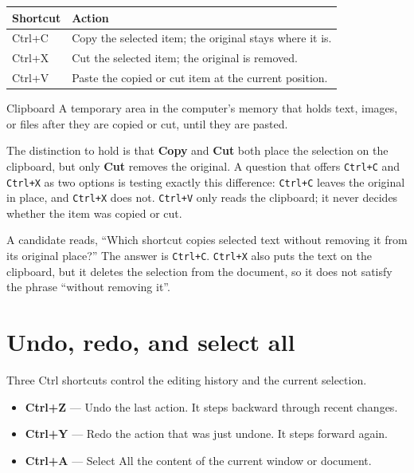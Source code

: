 \begin{center}
\begin{tabular}{p{}p{}}
\toprule
\textbf{Shortcut} & \textbf{Action} \\
\midrule
Ctrl+C & Copy the selected item; the original stays where it is. \\
Ctrl+X & Cut the selected item; the original is removed. \\
Ctrl+V & Paste the copied or cut item at the current position. \\
\bottomrule
\end{tabular}
\end{center}

\begin{definitionbox}{Clipboard}
A temporary area in the computer's memory that holds text, images, or files
after they are copied or cut, until they are pasted.
\end{definitionbox}

The distinction to hold is that \textbf{Copy} and \textbf{Cut} both place the
selection on the clipboard, but only \textbf{Cut} removes the original. A
question that offers \texttt{Ctrl+C} and \texttt{Ctrl+X} as two options is
testing exactly this difference: \texttt{Ctrl+C} leaves the original in place,
and \texttt{Ctrl+X} does not. \texttt{Ctrl+V} only reads the clipboard; it
never decides whether the item was copied or cut.

\begin{example}
A candidate reads, ``Which shortcut copies selected text without removing it
from its original place?'' The answer is \texttt{Ctrl+C}. \texttt{Ctrl+X} also
puts the text on the clipboard, but it deletes the selection from the
document, so it does not satisfy the phrase ``without removing it''.
\end{example}

\section{Undo, redo, and select all}
Three Ctrl shortcuts control the editing history and the current selection.

\begin{itemize}
  \item \textbf{Ctrl+Z} --- Undo the last action. It steps backward through
    recent changes.
  \item \textbf{Ctrl+Y} --- Redo the action that was just undone. It steps
    forward again.
  \item \textbf{Ctrl+A} --- Select All the content of the current window or
    document.
\end{itemize}

